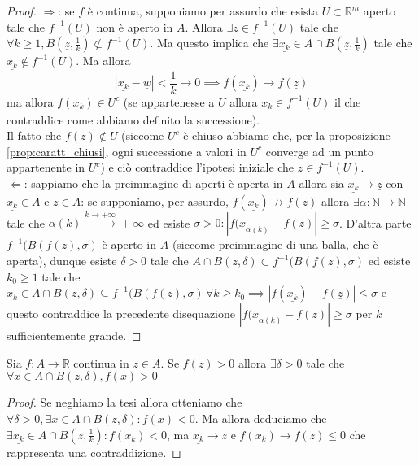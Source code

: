 \documentclass[openany]{book}
\begin{document}
\begin{proof} \hspace{1em} \newline
$\boxed{\Rightarrow}$: se $f$ è continua, supponiamo per assurdo che esista $U \subset \mathbb{R}^m$ aperto tale che $f^{-1}(U)$ non è aperto in $A$. Allora $\exists z \in f^{-1}(U)$ tale che $\forall k \geq 1, B(\underline{z}, \frac{1}{k}) \not\subset f^{-1}(U)$. Ma questo implica che $\exists \underline{x_k} \in A \cap B(\underline{z}, \frac{1}{k})$ tale che $\underline{x_k} \not\in f^{-1}(U)$. Ma allora 
$$
|\underline{x_k} - \underline{w}| < \frac{1}{k} \to 0 \implies f(\underline{x_k}) \to f(\underline{z})
$$
ma allora $f(x_k) \in U^c$ (se appartenesse a $U$ allora $\underline{x_k} \in f^{-1}(U)$ il che contraddice come abbiamo definito la successione). \\ Il fatto che $f(z) \not\in U$ (siccome $U^c$ è chiuso abbiamo che, per la proposizione \ref{prop:caratt_chiusi}, ogni successione a valori in $U^c$ converge ad un punto appartenente in $U^c$) e ciò contraddice l'ipotesi iniziale che $z \in f^{-1}(U)$. \\
$\boxed{\Leftarrow}$: sappiamo che la preimmagine di aperti è aperta in $A$ allora sia $\underline{x_k} \to \underline{z}$ con $\underline{x_k} \in A$ e $\underline{z} \in A$: se supponiamo, per assurdo, $f(\underline{x_k}) \not\to f(\underline{z})$ allora $\exists \alpha: \mathbb{N} \to \mathbb{N}$ tale che $\alpha(k) \stackrel{k \to +\infty}{\to} +\infty$ ed esiste $\sigma > 0: |f(\underline{x}_{\alpha(k)} - f(\underline{z})| \geq \sigma$. D'altra parte $f^{-1}(B(f(z), \sigma)$ è aperto in $A$ (siccome preimmagine di una balla, che è aperta), dunque esiste $\delta > 0$ tale che $A \cap B(z, \delta) \subset f^{-1}(B(f(z), \sigma)$ ed esiste $k_0 \geq 1$ tale che $x_k \in A \cap B(z, \delta) \subseteq f^{-1}(B(f(z), \sigma) \, \forall k \geq k_0 \implies |f(\underline{x_k}) - f(\underline{z})| \leq \sigma$ e questo contraddice la precedente disequazione $|f(\underline{x}_{\alpha(k)}-f(\underline{z})| \geq \sigma$ per $k$ sufficientemente grande.
\end{proof}
\begin{theorem}
Sia $f: A \to \mathbb{R}$ continua in $z \in A$. Se $f(z) > 0$ allora $\exists \delta > 0$ tale che $\forall x \in A \cap B(z, \delta), f(x) > 0$
\end{theorem}
\begin{proof}
Se neghiamo la tesi allora otteniamo che $\forall \delta > 0, \exists x \in A \cap B(z, \delta): f(x) < 0$. Ma allora deduciamo che $\exists \underline{x_k} \in A \cap B(z, \frac{1}{k}): f(x_k) <0$, ma $\underline{x_k} \to z$ e $f(x_k) \to f(z) \leq 0$ che rappresenta una contraddizione.
\end{proof}
\end{document}
